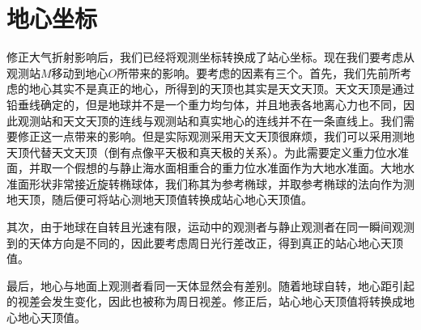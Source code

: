 \documentclass[11pt, a4paper, oneside]{ctexart}
\numberwithin{equation}{subsection}
\begin{document}
\section{地心坐标}
修正大气折射影响后，我们已经将观测坐标转换成了站心坐标。现在我们要考虑从观测站$M$移动到地心$O$所带来的影响。要考虑的因素有三个。首先，我们先前所考虑的地心其实不是真正的地心，所得到的天顶也其实是天文天顶。天文天顶是通过铅垂线确定的，但是地球并不是一个重力均匀体，并且地表各地离心力也不同，因此观测站和天文天顶的连线与观测站和真实地心的连线并不在一条直线上。我们需要修正这一点带来的影响。但是实际观测采用天文天顶很麻烦，我们可以采用测地天顶代替天文天顶（倒有点像平天极和真天极的关系）。为此需要定义重力位水准面，并取一个假想的与静止海水面相重合的重力位水准面作为大地水准面。大地水准面形状非常接近旋转椭球体，我们称其为参考椭球，并取参考椭球的法向作为测地天顶，随后便可将站心测地天顶值转换成站心地心天顶值。

其次，由于地球在自转且光速有限，运动中的观测者与静止观测者在同一瞬间观测到的天体方向是不同的，因此要考虑周日光行差改正，得到真正的站心地心天顶值。

最后，地心与地面上观测者看同一天体显然会有差别。随着地球自转，地心距引起的视差会发生变化，因此也被称为周日视差。修正后，站心地心天顶值将转换成地心地心天顶值。
\end{document}
